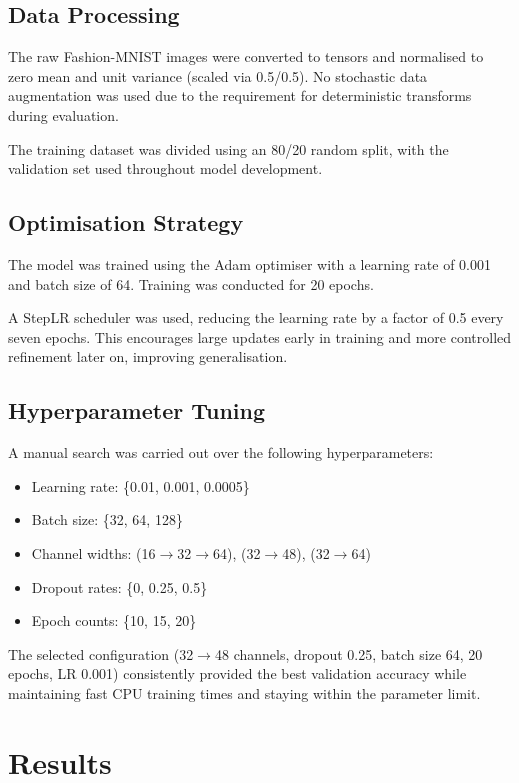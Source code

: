 \documentclass[11pt]{article}
\begin{document}
\subsection{Data Processing}

The raw Fashion-MNIST images were converted to tensors and normalised to zero mean and unit variance (scaled via 0.5/0.5). No stochastic data augmentation was used due to the requirement for deterministic transforms during evaluation.

The training dataset was divided using an 80/20 random split, with the validation set used throughout model development.

\subsection{Optimisation Strategy}

The model was trained using the Adam optimiser with a learning rate of 0.001 and batch size of 64. Training was conducted for 20 epochs.

A StepLR scheduler was used, reducing the learning rate by a factor of 0.5 every seven epochs. This encourages large updates early in training and more controlled refinement later on, improving generalisation.

\subsection{Hyperparameter Tuning}

A manual search was carried out over the following hyperparameters:
\begin{itemize}
    \item Learning rate: \{0.01, 0.001, 0.0005\}
    \item Batch size: \{32, 64, 128\}
    \item Channel widths: (16$\rightarrow$32$\rightarrow$64), (32$\rightarrow$48), (32$\rightarrow$64)
    \item Dropout rates: \{0, 0.25, 0.5\}
    \item Epoch counts: \{10, 15, 20\}
\end{itemize}

The selected configuration (32$\rightarrow$48 channels, dropout 0.25, batch size 64, 20 epochs, LR 0.001) consistently provided the best validation accuracy while maintaining fast CPU training times and staying within the parameter limit.

\section{Results}
\end{document}
